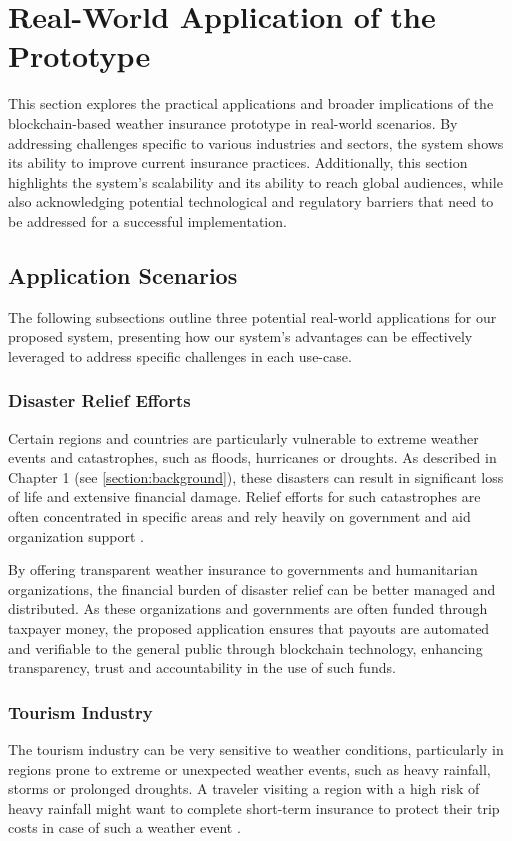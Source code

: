 \section{Real-World Application of the Prototype}\label{section:real_world_application_prototype}
This section explores the practical applications and broader implications of the blockchain-based weather insurance prototype in real-world scenarios. By addressing challenges specific to various industries and sectors, the system shows its ability to improve current insurance practices. Additionally, this section highlights the system's scalability and its ability to reach global audiences, while also acknowledging potential technological and regulatory barriers that need to be addressed for a successful implementation.

\subsection{Application Scenarios}
The following subsections outline three potential real-world applications for our proposed system, presenting how our system's advantages can be effectively leveraged to address specific challenges in each use-case.

\subsubsection{Disaster Relief Efforts}\label{disaster_relief}
Certain regions and countries are particularly vulnerable to extreme weather events and catastrophes, such as floods, hurricanes or droughts. As described in Chapter 1 (see \cref{section:background}), these disasters can result in significant loss of life and extensive financial damage. Relief efforts for such catastrophes are often concentrated in specific areas and rely heavily on government and aid organization support \autocite{Fitch-Fleischmann2021Story}.

By offering transparent weather insurance to governments and humanitarian organizations, the financial burden of disaster relief can be better managed and distributed. As these organizations and governments are often funded through taxpayer money, the proposed application ensures that payouts are automated and verifiable to the general public through blockchain technology, enhancing transparency, trust and accountability in the use of such funds.

\subsubsection{Tourism Industry}\label{tourism_industry}
The tourism industry can be very sensitive to weather conditions, particularly in regions prone to extreme or unexpected weather events, such as heavy rainfall, storms or prolonged droughts. A traveler visiting a region with a high risk of heavy rainfall might want to complete short-term insurance to protect their trip costs in case of such a weather event \autocite{Wilkins2018Effects}.

